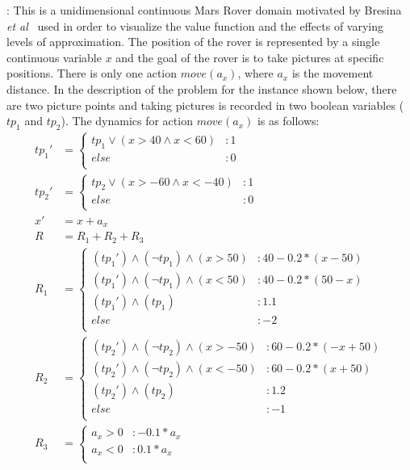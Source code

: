 \MarsRoverUni:
This is a unidimensional continuous Mars Rover domain motivated by
Bresina {\it et al}~\cite{bresina02} used in order to visualize the
value function and the effects of varying levels of approximation.
The position of the rover is represented by a single continuous
variable $x$ and the goal of the rover is to take pictures at
specific positions.  There is only one action $\mathit{move}(a_x)$,
where $a_x$ is the movement distance. In the description of the
problem for the instance shown below, there are two picture
points and taking pictures is recorded in two boolean variables
($tp_1$ and $tp_2$). The dynamics for action $move(a_x)$ is as
follows: {\footnotesize
\begin{align*}
tp_1' &= \begin{cases}
tp_1 \vee (x>40 \wedge x<60)&: 1\\
else&: 0\\
\end{cases}\\
tp_2' &= \begin{cases}
tp_2 \vee (x>-60 \wedge x<-40)&: 1\\
else&: 0\\
\end{cases}\\
x' &=  x +a_x\\
R & = R_1 + R_2 + R_3\\
R_1 & = \begin{cases} 
(tp_1') \wedge (\neg tp_1) \wedge (x > 50) &: 40 - 0.2*(x -50)\\
(tp_1') \wedge (\neg tp_1) \wedge (x < 50) &: 40 - 0.2*(50-x)\\
(tp_1') \wedge ( tp_1) &:  1.1\\
else &: -2\\
\end{cases} \\
R_2 & = \begin{cases} 
(tp_2') \wedge (\neg tp_2) \wedge (x > -50) &: 60 - 0.2*(-x +50)\\
(tp_2') \wedge (\neg tp_2) \wedge (x < -50) &: 60 - 0.2*(x +50)\\
(tp_2') \wedge ( tp_2) &:  1.2\\
else &: -1\\
\end{cases} \\
R_3 & = \begin{cases} 
a_x > 0 &: -0.1*a_x\\
a_x < 0 &: 0.1*a_x\\
\end{cases} \\
\end{align*} }
\vspace{-10mm}

